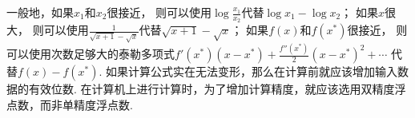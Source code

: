 一般地，如果\(x_1\)和\(x_2\)很接近，
则可以使用\(\log\frac{x_1}{x_2}\)代替\(\log x_1 - \log x_2\)；
如果\(x\)很大，
则可以使用\(\frac{1}{\sqrt{x+1} - \sqrt{x}}\)代替\(\sqrt{x+1} - \sqrt{x}\)；
如果\(f(x)\)和\(f(x^*)\)很接近，
则可以使用次数足够大的泰勒多项式\(f'(x^*) (x-x^*) + \frac{f''(x^*)}{2} (x-x^*)^2 + \dotsb\)
代替\(f(x) - f(x^*)\).
如果计算公式实在无法变形，那么在计算前就应该增加输入数据的有效位数.
在计算机上进行计算时，为了增加计算精度，就应该选用双精度浮点数，而非单精度浮点数.
